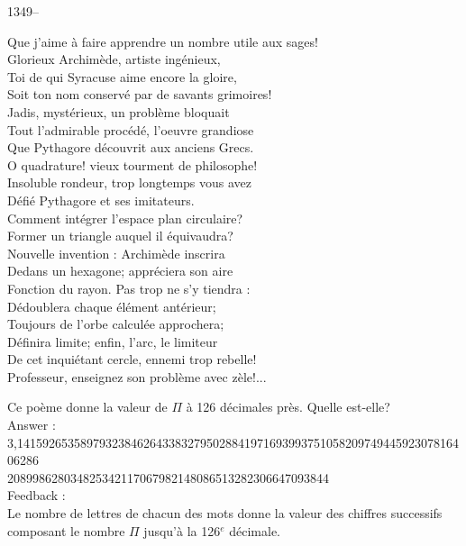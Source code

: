 \documentclass[letterpaper, 12pt]{article}
\begin{document}
1349--\begin{center}{Que j'aime \`a faire apprendre un nombre utile aux
sages! \\
Glorieux Archim\`ede, artiste ing\'enieux,\\
Toi de qui Syracuse aime encore la gloire,\\
Soit ton nom conserv\'e par de savants grimoires! \\
Jadis, myst\'erieux, un probl\`eme bloquait \\
Tout l'admirable proc\'ed\'e, l'oeuvre grandiose\\
Que Pythagore d\'ecouvrit aux anciens Grecs. \\
O quadrature! vieux tourment de philosophe!\\
Insoluble rondeur, trop longtemps vous avez \\
D\'efi\'e Pythagore et ses imitateurs. \\
Comment int\'egrer l'espace plan circulaire?\\
Former un triangle auquel il \'equivaudra? \\
Nouvelle invention : Archim\`ede inscrira \\
Dedans un hexagone; appr\'eciera son aire \\
Fonction du rayon. Pas trop ne s'y tiendra :\\
D\'edoublera chaque \'el\'ement ant\'erieur; \\
Toujours de l'orbe calcul\'ee approchera;\\
D\'efinira limite; enfin, l'arc, le limiteur\\
De cet inqui\'etant cercle, ennemi trop rebelle!\\
Professeur, enseignez son probl\`eme avec z\`ele!...\\}
\end{center}
Ce po\`eme donne la valeur de $\Pi$ \`a 126  d\'ecimales pr\`es. Quelle
est-elle?\\

Answer : \\
3,141592653589793238462643383279502884197169399375105820974944592307816406286\\
208998628034825342117067982148086513282306647093844\\

Feedback : \\

Le nombre de lettres de chacun des mots donne la valeur des chiffres
successifs composant le nombre $\Pi$ jusqu'\`a la 126$^e$ d\'ecimale.\\
\end{document}
